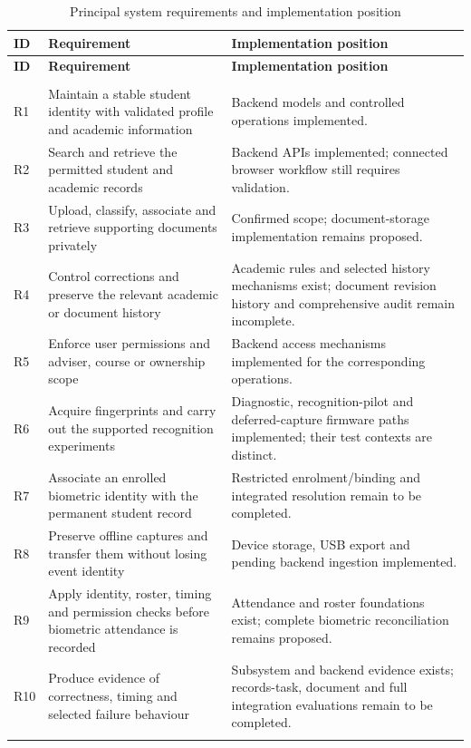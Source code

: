 \begingroup
\singlespacing%
\setlength{\tabcolsep}{4pt}
\begin{longtable}{@{}>{\RaggedRight\arraybackslash}p{}>{\RaggedRight\arraybackslash}p{}>{\RaggedRight\arraybackslash}p{}@{}}
\caption{Principal system requirements and implementation position}\label{tab:3-1}\\
\toprule
\textbf{ID} & \textbf{Requirement} & \textbf{Implementation position} \\
\midrule
\endfirsthead%
\toprule
\textbf{ID} & \textbf{Requirement} & \textbf{Implementation position} \\
\midrule
\endhead%
\midrule
\multicolumn{3}{r}{Continued on next page}\\
\endfoot%
\bottomrule
\endlastfoot%
R1 & Maintain a stable student identity with validated profile and academic information & Backend models and controlled operations implemented. \\ \addlinespace
R2 & Search and retrieve the permitted student and academic records & Backend APIs implemented; connected browser workflow still requires validation. \\ \addlinespace
R3 & Upload, classify, associate and retrieve supporting documents privately & Confirmed scope; document-storage implementation remains proposed. \\ \addlinespace
R4 & Control corrections and preserve the relevant academic or document history & Academic rules and selected history mechanisms exist; document revision history and comprehensive audit remain incomplete. \\ \addlinespace
R5 & Enforce user permissions and adviser, course or ownership scope & Backend access mechanisms implemented for the corresponding operations. \\ \addlinespace
R6 & Acquire fingerprints and carry out the supported recognition experiments & Diagnostic, recognition-pilot and deferred-capture firmware paths implemented; their test contexts are distinct. \\ \addlinespace
R7 & Associate an enrolled biometric identity with the permanent student record & Restricted enrolment/binding and integrated resolution remain to be completed. \\ \addlinespace
R8 & Preserve offline captures and transfer them without losing event identity & Device storage, USB export and pending backend ingestion implemented. \\ \addlinespace
R9 & Apply identity, roster, timing and permission checks before biometric attendance is recorded & Attendance and roster foundations exist; complete biometric reconciliation remains proposed. \\ \addlinespace
R10 & Produce evidence of correctness, timing and selected failure behaviour & Subsystem and backend evidence exists; records-task, document and full integration evaluations remain to be completed. \\ \addlinespace
\end{longtable}
\endgroup
